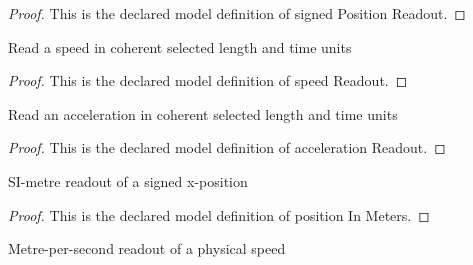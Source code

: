 \begin{proof}
  This is the declared model definition of signed Position Readout.
\end{proof}
\begin{definition}
  \label{def:physics:phyx-mini-0794:phyxminiproblems-problemphyxmini0794-speedreadout}
  Read a speed in coherent selected length and time units
\end{definition}
\begin{proof}
  This is the declared model definition of speed Readout.
\end{proof}
\begin{definition}
  \label{def:physics:phyx-mini-0794:phyxminiproblems-problemphyxmini0794-accelerationreadout}
  Read an acceleration in coherent selected length and time units
\end{definition}
\begin{proof}
  This is the declared model definition of acceleration Readout.
\end{proof}
\begin{definition}
  \label{def:physics:phyx-mini-0794:phyxminiproblems-problemphyxmini0794-positioninmeters}
  SI-metre readout of a signed x-position
\end{definition}
\begin{proof}
  This is the declared model definition of position In Meters.
\end{proof}
\begin{definition}
  \label{def:physics:phyx-mini-0794:phyxminiproblems-problemphyxmini0794-speedinmeterspersecond}
  Metre-per-second readout of a physical speed
\end{definition}
